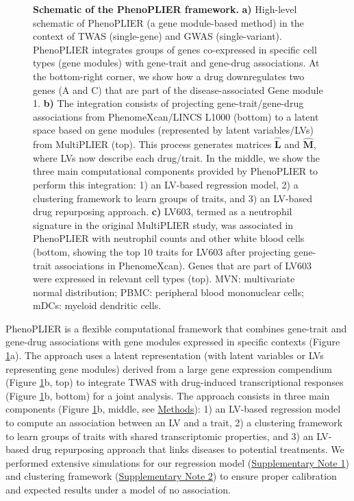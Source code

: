 \documentclass[
        11pt,
]{article}
\begin{document}
\begin{figure}
\hypertarget{fig:entire_process}{%
\centering

\caption{\textbf{Schematic of the PhenoPLIER framework.}
\textbf{a)} High-level schematic of PhenoPLIER (a gene module-based method) in the context of TWAS (single-gene) and GWAS (single-variant).
PhenoPLIER integrates groups of genes co-expressed in specific cell types (gene modules) with gene-trait and gene-drug associations.
At the bottom-right corner, we show how a drug downregulates two genes (A and C) that are part of the disease-associated Gene module 1.
\textbf{b)} The integration consists of projecting gene-trait/gene-drug associations from PhenomeXcan/LINCS L1000 (bottom) to a latent space based on gene modules (represented by latent variables/LVs) from MultiPLIER (top).
This process generates matrices \(\mathbf{\hat{L}}\) and \(\mathbf{\hat{M}}\), where LVs now describe each drug/trait.
In the middle, we show the three main computational components provided by PhenoPLIER to perform this integration:
1) an LV-based regression model,
2) a clustering framework to learn groups of traits,
and 3) an LV-based drug repurposing approach.
\textbf{c)} LV603, termed as a neutrophil signature in the original MultiPLIER study, was associated in PhenoPLIER with neutrophil counts and other white blood cells (bottom, showing the top 10 traits for LV603 after projecting gene-trait associations in PhenomeXcan).
Genes that are part of LV603 were expressed in relevant cell types (top).
MVN: multivariate normal distribution;
PBMC: peripheral blood mononuclear cells;
mDCs: myeloid dendritic cells.}\label{fig:entire_process}
}
\end{figure}

PhenoPLIER is a flexible computational framework that combines gene-trait and gene-drug associations with gene modules expressed in specific contexts (Figure \ref{fig:entire_process}a).
The approach uses a latent representation (with latent variables or LVs representing gene modules) derived from a large gene expression compendium (Figure \ref{fig:entire_process}b, top) to integrate TWAS with drug-induced transcriptional responses (Figure \ref{fig:entire_process}b, bottom) for a joint analysis.
The approach consists in three main components (Figure \ref{fig:entire_process}b, middle, see \protect\hyperlink{sec:methods}{Methods}):
1) an LV-based regression model to compute an association between an LV and a trait,
2) a clustering framework to learn groups of traits with shared transcriptomic properties,
and 3) an LV-based drug repurposing approach that links diseases to potential treatments.
We performed extensive simulations for our regression model (\protect\hyperlink{sm:reg:null_sim}{Supplementary Note 1}) and clustering framework (\protect\hyperlink{sm:clustering:null_sim}{Supplementary Note 2}) to ensure proper calibration and expected results under a model of no association.
\end{document}
